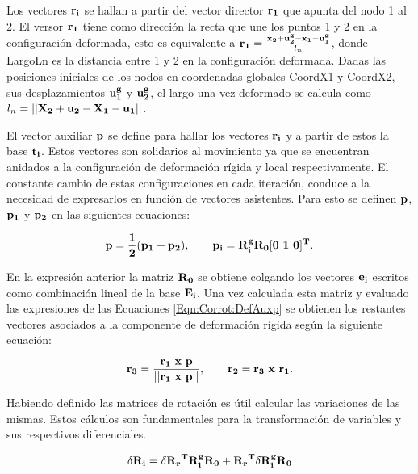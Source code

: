  Los vectores $\bf{r_i}$ se hallan a partir del vector director $\bf{r_1}$ que apunta del nodo 1 al 2.  El versor $\bf{r_1}$ tiene como dirección la recta que une los puntos 1 y 2 en la configuración deformada, esto es equivalente a $\bf{r_1}=\frac{\bf{x}_2+\bf{u}_2^g-\bf{x}_1-\bf{u}_1^g}{\text{$l_n$}}$, donde \gls{LargoLn} es la distancia entre 1 y 2 en la configuración deformada. Dadas las posiciones iniciales de los nodos en coordenadas globales \gls{CoordX1} y \gls{CoordX2}, sus desplazamientos $\bf{u}_1^g$ y $\bf{u}_2^g$, el largo una vez deformado se calcula como $l_n=||\bf{X}_2+\bf{u}_2-\bf{X}_1-\bf{u}_1||$.
 
El vector auxiliar $\bf{p}$ se define para hallar los vectores $\bf{r}_i$ y a partir de estos la base $\bf{t}_i$. Estos vectores son solidarios al movimiento ya que se encuentran anidados a la configuración de deformación rígida y local respectivamente. El constante cambio de estas configuraciones en cada iteración, conduce a la necesidad de expresarlos en función de vectores asistentes. Para esto se definen
$\bf{p}$, $\bf{p_1}$ y $\bf{p_2}$ en las siguientes ecuaciones:

\begin{equation}\label{Eqn:Corrot:DefAuxp}
	\bf{p}=\frac{1}{2}(\bf{p}_1+\bf{p}_2),~~~~~~\bf{p_i}=\bf{R}_i^g\bf{R}_0[0~1~0]^T.
\end{equation}

En la expresión anterior la matriz $\bf{R}_0$ se obtiene colgando los vectores $\bf{e}_i$ escritos como combinación lineal de la base $\bf{E_i}$. Una vez calculada esta matriz y evaluado las expresiones de las Ecuaciones \eqref{Eqn:Corrot:DefAuxp} se obtienen los restantes vectores asociados a la componente de deformación rígida según la siguiente ecuación:


\begin{equation}\label{Eqn:Corrot:VectorsR}
	\bf{r}_3=\frac{\bf{r_1}~x~\bf{p}}{||\bf{r_1}~x~\bf{p}||},~~~~~~\bf{r_2}=\bf{r_3}~x~\bf{r_1}.
\end{equation}


Habiendo definido las matrices de rotación  es útil calcular las variaciones de las mismas. Estos cálculos son fundamentales para la transformación de variables y sus respectivos diferenciales.

\begin{equation}\label{eq:PRE:DifMatrix}
	\delta \overline{\bf{R_i}}=\delta\bf{R_r}^T\bf{R_i^g}\bf{R_0}+\bf{R_r}^T\delta \bf{R_i^g}\bf{R_0}
\end{equation}

